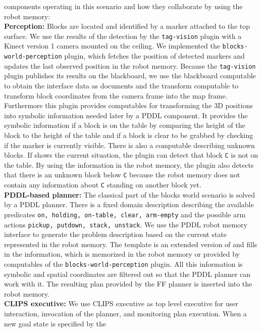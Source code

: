 components operating in this scenario and how they collaborate by
using the robot memory:
\\
\textbf{Perception:} Blocks are located and identified by a marker
attached to the top surface. We use the results of the detection by
the \texttt{tag-vision} plugin with a Kinect version 1 camera mounted
on the ceiling. We implemented the \texttt{blocks-world-perception}
plugin, which fetches the position of detected markers and updates the
last observed position in the robot memory. Because the
\texttt{tag-vision} plugin publishes its results on the blackboard, we
use the blackboard computable to obtain the interface data as
documents and the transform computable to transform block coordinates
from the camera frame into the map frame. Furthermore this plugin
provides computables for transforming the 3D positions into symbolic
information needed later by a PDDL component. It provides the symbolic
information if a block is on the table by comparing the height of the
block to the height of the table and if a block is clear to be grabbed
by checking if the marker is currently visible. There is also a
computable describing unknown blocks. If 
shows the current situation, the plugin can detect that block
\texttt{C} is not on the table. By using the information in the robot
memory, the plugin also detects that there is an unknown block below
\texttt{C} because the robot memory does not contain any information
about \texttt{C} standing on another block yet.
\\
\textbf{PDDL-based planner:} The classical part of the blocks world scenario
is solved by a PDDL planner. There is a fixed domain description
describing the available predicates \texttt{on, holding, on-table,
  clear, arm-empty} and the possible arm actions \texttt{pickup,
  putdown, stack, unstack}. We use the PDDL robot memory interface to
generate the problem description based on the current state
represented in the robot memory. The template is an extended version
of  and fills in the information, which is
memorized in the robot memory or provided by computables of the
\texttt{blocks-world-perception} plugin. All this information is
symbolic and spatial coordinates are filtered out so that the PDDL
planner can work with it. The resulting plan provided by the FF
planner is inserted into the robot memory.
\\
\textbf{CLIPS executive:} We use CLIPS executive as top level
executive for user interaction, invocation of the planner, and
monitoring plan execution. When a new goal state is specified by the

